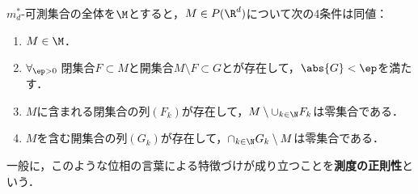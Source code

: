\documentclass[uplatex, dvipdfmx]{jsreport}
\begin{document}
\begin{theorem}[Lebesgue可測集合の特徴付け]\label{thm-characterization-of-Lebesgue-measurable-sets}
    $m^*_d$-可測集合の全体を$\M$とすると，$M\in P(\R^d)$について次の4条件は同値：
    \begin{enumerate}
        \item $M\in\M$．
        \item $\forall_{\ep>0}\;$閉集合$F\subset M$と開集合$M\setminus F\subset G$とが存在して，$\abs{G}<\ep$を満たす．
        \item $M$に含まれる閉集合の列$(F_k)$が存在して，$M\setminus\cup_{k\in\N}F_k$は零集合である．
        \item $M$を含む開集合の列$(G_k)$が存在して，$\cap_{k\in\N}G_k\setminus M$は零集合である．
    \end{enumerate}
    一般に，このような位相の言葉による特徴づけが成り立つことを\textbf{測度の正則性}という．
\end{theorem}
\end{document}

